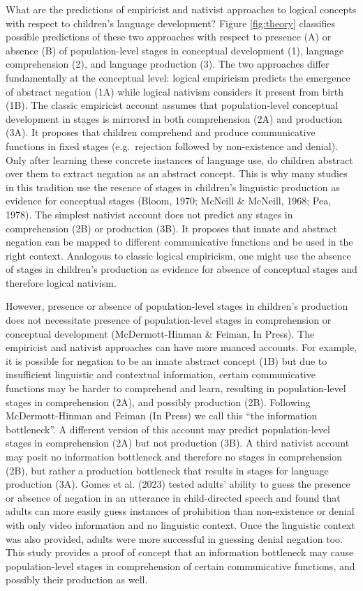 \documentclass[
  man,floatsintext]{apa6}
\begin{document}
What are the predictions of empiricist and nativist approaches to logical concepts with respect to children's language development? Figure \ref{fig:theory} classifies possible predictions of these two approaches with respect to presence (A) or absence (B) of population-level stages in conceptual development (1), language comprehension (2), and language production (3). The two approaches differ fundamentally at the conceptual level: logical empiricism predicts the emergence of abstract negation (1A) while logical nativism considers it present from birth (1B). The classic empiricist account assumes that population-level conceptual development in stages is mirrored in both comprehension (2A) and production (3A). It proposes that children comprehend and produce communicative functions in fixed stages (e.g.~rejection followed by non-existence and denial). Only after learning these concrete instances of language use, do children abstract over them to extract negation as an abstract concept. This is why many studies in this tradition use the resence of stages in children's linguistic production as evidence for conceptual stages (Bloom, 1970; McNeill \& McNeill, 1968; Pea, 1978). The simplest nativist account does not predict any stages in comprehension (2B) or production (3B). It proposes that innate and abstract negation can be mapped to different communicative functions and be used in the right context. Analogous to classic logical empiricism, one might use the absence of stages in children's production as evidence for absence of conceptual stages and therefore logical nativism.

However, presence or absence of population-level stages in children's production does not necessitate presence of population-level stages in comprehension or conceptual development (McDermott-Hinman \& Feiman, In Press). The empiricist and nativist approaches can have more nuanced accounts. For example, it is possible for negation to be an innate abstract concept (1B) but due to insufficient linguistic and contextual information, certain communicative functions may be harder to comprehend and learn, resulting in population-level stages in comprehension (2A), and possibly production (2B). Following McDermott-Hinman and Feiman (In Press) we call this ``the information bottleneck''. A different version of this account may predict population-level stages in comprehension (2A) but not production (3B). A third nativist account may posit no information bottleneck and therefore no stages in comprehension (2B), but rather a production bottleneck that results in stages for language production (3A). Gomes et al. (2023) tested adults' ability to guess the presence or absence of negation in an utterance in child-directed speech and found that adults can more easily guess instances of prohibition than non-existence or denial with only video information and no linguistic context. Once the linguistic context was also provided, adults were more successful in guessing denial negation too. This study provides a proof of concept that an information bottleneck may cause population-level stages in comprehension of certain communicative functions, and possibly their production as well.
\end{document}
